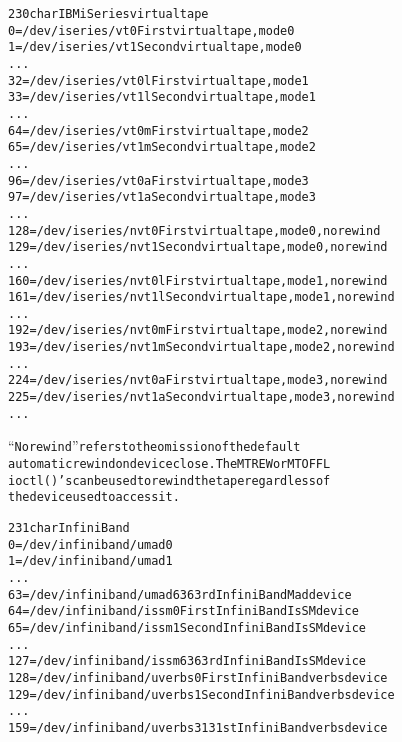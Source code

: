 \documentclass[a4paper,8pt,english]{sphinxmanual}
\begin{document}
\begin{alltt}
 230 char       IBM iSeries virtual tape
                  0 = /dev/iseries/vt0          First virtual tape, mode 0
                  1 = /dev/iseries/vt1          Second virtual tape, mode 0
                    ...
                 32 = /dev/iseries/vt0l         First virtual tape, mode 1
                 33 = /dev/iseries/vt1l         Second virtual tape, mode 1
                    ...
                 64 = /dev/iseries/vt0m         First virtual tape, mode 2
                 65 = /dev/iseries/vt1m         Second virtual tape, mode 2
                    ...
                 96 = /dev/iseries/vt0a         First virtual tape, mode 3
                 97 = /dev/iseries/vt1a         Second virtual tape, mode 3
                      ...
                128 = /dev/iseries/nvt0         First virtual tape, mode 0, no rewind
                129 = /dev/iseries/nvt1         Second virtual tape, mode 0, no rewind
                    ...
                160 = /dev/iseries/nvt0l        First virtual tape, mode 1, no rewind
                161 = /dev/iseries/nvt1l        Second virtual tape, mode 1, no rewind
                    ...
                192 = /dev/iseries/nvt0m        First virtual tape, mode 2, no rewind
                193 = /dev/iseries/nvt1m        Second virtual tape, mode 2, no rewind
                    ...
                224 = /dev/iseries/nvt0a        First virtual tape, mode 3, no rewind
                225 = /dev/iseries/nvt1a        Second virtual tape, mode 3, no rewind
                    ...

                ``No rewind'' refers to the omission of the default
                automatic rewind on device close.  The MTREW or MTOFFL
                ioctl()'s can be used to rewind the tape regardless of
                the device used to access it.

 231 char       InfiniBand
                0 = /dev/infiniband/umad0
                1 = /dev/infiniband/umad1
                  ...
                63 = /dev/infiniband/umad63    63rd InfiniBandMad device
                64 = /dev/infiniband/issm0     First InfiniBand IsSM device
                65 = /dev/infiniband/issm1     Second InfiniBand IsSM device
                  ...
                127 = /dev/infiniband/issm63    63rd InfiniBand IsSM device
                128 = /dev/infiniband/uverbs0   First InfiniBand verbs device
                129 = /dev/infiniband/uverbs1   Second InfiniBand verbs device
                  ...
                159 = /dev/infiniband/uverbs31  31st InfiniBand verbs device


\end{alltt}
\end{document}
